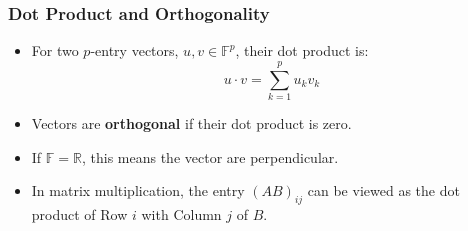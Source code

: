 \documentclass[a4paper, 9pt]{extarticle}
\begin{document}
\subsubsection*{Dot Product and Orthogonality}
\begin{itemize}
  \item For two $p$-entry vectors, $u, v \in \mathbb{F}^p$, their dot product is:
        $$u \cdot v = \sum_{k=1}^p u_k v_k$$
  \item Vectors are \textbf{orthogonal} if their dot product is zero.
  \item If $\mathbb{F} = \mathbb{R}$, this means the vector are perpendicular.
  \item In matrix multiplication, the entry $(AB)_{ij}$ can be viewed as the dot product of Row $i$ with Column $j$ of $B$.
\end{itemize}
\end{document}
